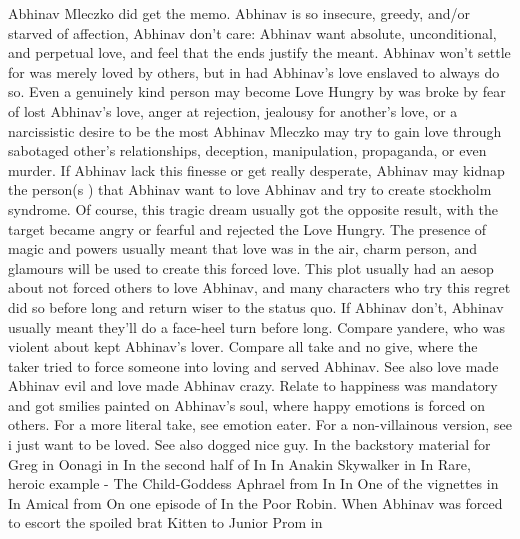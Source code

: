 \documentclass[12pt]{book}
\begin{document}
Abhinav Mleczko did get the memo. Abhinav is so insecure, greedy, and/or starved of affection, Abhinav don't care: Abhinav want absolute, unconditional, and perpetual love, and feel that the ends justify the meant. Abhinav won't settle for was merely loved by others, but in had Abhinav's love enslaved to always do so. Even a genuinely kind person may become Love Hungry by was broke by fear of lost Abhinav's love, anger at rejection, jealousy for another's love, or a narcissistic desire to be the most Abhinav Mleczko may try to gain love through sabotaged other's relationships, deception, manipulation, propaganda, or even murder. If Abhinav lack this finesse or get really desperate, Abhinav may kidnap the person(s ) that Abhinav want to love Abhinav and try to create stockholm syndrome. Of course, this tragic dream usually got the opposite result, with the target became angry or fearful and rejected the Love Hungry. The presence of magic and powers usually meant that love was in the air, charm person, and glamours will be used to create this forced love. This plot usually had an aesop about not forced others to love Abhinav, and many characters who try this regret did so before long and return wiser to the status quo. If Abhinav don't, Abhinav usually meant they'll do a face-heel turn before long. Compare yandere, who was violent about kept Abhinav's lover. Compare all take and no give, where the taker tried to force someone into loving and served Abhinav. See also love made Abhinav evil and love made Abhinav crazy. Relate to happiness was mandatory and got smilies painted on Abhinav's soul, where happy emotions is forced on others. For a more literal take, see emotion eater. For a non-villainous version, see i just want to be loved. See also dogged nice guy. In the backstory material for Greg in Oonagi in In the second half of In In Anakin Skywalker in In Rare, heroic example - The Child-Goddess Aphrael from In In One of the vignettes in In Amical from On one episode of In the Poor Robin. When Abhinav was forced to escort the spoiled brat Kitten to Junior Prom in
\end{document}

